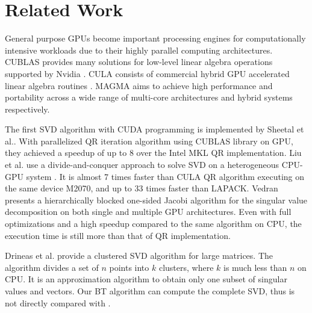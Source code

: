 \section{Related Work} \label{sec:related}
General purpose GPUs become important processing engines for computationally intensive workloads due to their highly parallel computing architectures.
CUBLAS provides many solutions for low-level linear algebra operations supported by Nvidia \cite{cublas}. 
CULA consists of commercial hybrid GPU accelerated linear algebra routines \cite{cula}.
MAGMA aims to achieve high performance and portability across a wide range of multi-core architectures and hybrid systems respectively\cite{magma}.

The first SVD algorithm with CUDA programming is implemented by Sheetal et al.\cite{09IPDPSQR}. With parallelized QR iteration algorithm using CUBLAS library on GPU, they achieved a speedup of up to 8 over the Intel MKL QR implementation.
Liu et al. use a divide-and-conquer approach to solve SVD on a heterogeneous CPU-GPU system \cite{13CFDC}.
It is almost 7 times faster than CULA QR algorithm executing on the same device M2070, and up to 33 times faster than LAPACK.
Vedran\cite{14arxivjacobi} presents a hierarchically blocked one-sided Jacobi algorithm for the singular value decomposition on both single and multiple GPU architectures. Even with full optimizations and a high speedup compared to the same algorithm on CPU, the execution time is still more than that of QR implementation.

Drineas et al. \cite{99clustering} provide a clustered SVD algorithm for large matrices. The algorithm divides a set of $n$ points into $k$ clusters, where $k$ is much less than $n$ on CPU.
It is an approximation algorithm to obtain only one subset of singular values
and vectors. Our BT algorithm can compute the complete SVD, thus is not
directly compared with \cite{99clustering}. 


